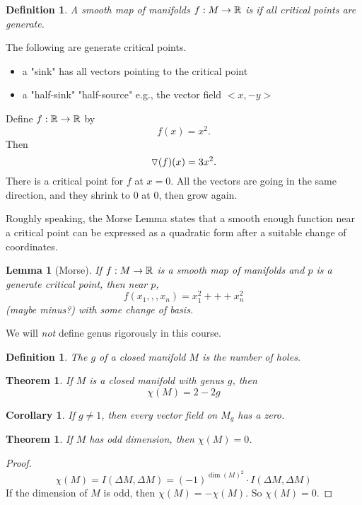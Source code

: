 \documentclass[11pt]{amsbook}
\theoremstyle{mystyle} \newtheorem{thrm}[thm]{Theorem}
\theoremstyle{mystyle} \newtheorem{defi}[thm]{Definition}
\theoremstyle{mystyle} \newtheorem{coro}[thm]{Corollary}
\theoremstyle{mystyle} \newtheorem{propo}[thm]{Proposition}
\theoremstyle{mystyle} \newtheorem{lemm}[thm]{Lemma}
\numberwithin{thm}{section}
\begin{document}
\begin{defi}
	A smooth map of manifolds $f: M \to {\mathbb R}$ is  if all critical points are generate.
\end{defi}

\begin{example}
	The following are generate critical points.
	\begin{itemize}
		\item a "sink" has all vectors pointing to the critical point
		\item a "half-sink" "half-source" e.g., the vector field $< x, -y >$
	\end{itemize}
\end{example}

\begin{example}
	Define $f: {\mathbb R} \to {\mathbb R}$ by
	$$f(x) = x^2.$$ Then
	$$\triangledown(f)(x) = 3x^2.$$
	There is a critical point for $f$ at $x = 0$.
	All the vectors are going in the same direction, and they shrink to 0 at 0, then grow again.
\end{example}

Roughly speaking, the Morse Lemma states that a smooth enough function near a critical point can be expressed as a quadratic form after a suitable change of coordinates.

\begin{lemm}[Morse]
	If $f: M \to {\mathbb R}$ is a smooth map of manifolds and $p$ is a generate critical point, then near $p$, $$f(x_1,,,x_n) = x_1^2 +++ x_n^2$$ (maybe minus?) with some change of basis.
\end{lemm}

We will \emph{not} define genus rigorously in this course.

\begin{defi}
	The  $g$ of a closed manifold $M$ is the number of holes.
\end{defi}
\begin{thrm}
	If $M$ is a closed manifold with genus $g$, then $$\chi(M) = 2 - 2g$$
\end{thrm}
\begin{coro}
	If $g \neq 1$, then every vector field on $M_g$ has a zero.
\end{coro}

\begin{thrm}
	If $M$ has odd dimension, then $\chi(M) = 0$.
\end{thrm}
\begin{proof}
	$$\chi(M) = I(\Delta M, \Delta M) = (-1)^{\dim(M)^2} \cdot I(\Delta M, \Delta M)$$
	If the dimension of $M$ is odd, then $\chi(M) = -\chi(M)$.
	So $\chi(M) = 0$.
\end{proof}
\end{document}
